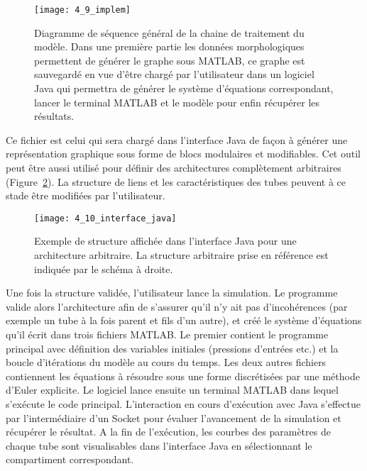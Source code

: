 \vspace{0.4cm}
\begin{figure}[!b]
\centering
\texttt{[image: 4\_9\_implem]}
\caption{Diagramme de séquence général de la chaine de traitement du modèle. Dans une première partie les données
morphologiques permettent de générer le graphe sous MATLAB, ce graphe est sauvegardé en vue d’être chargé par
l’utilisateur dans un logiciel Java qui permettra de générer le système d’équations correspondant, lancer le terminal MATLAB
et le modèle pour enfin récupérer les résultats.}
\label{fig:4_9_implem}	
\end{figure}
Ce fichier est celui qui sera chargé dans l’interface Java de façon à générer une représentation
graphique sous forme de blocs modulaires et modifiables. Cet outil peut être aussi utilisé pour définir
des architectures complètement arbitraires (Figure~\ref{fig:4_10_interface_java}). La structure de liens et les caractéristiques des
tubes peuvent à ce stade être modifiées par l’utilisateur.\\
\begin{figure}[!t]
\centering
\texttt{[image: 4\_10\_interface\_java]}
\caption{Exemple de structure affichée dans l'interface Java pour une architecture arbitraire. La structure arbitraire prise
en référence est indiquée par le schéma à droite.}
\label{fig:4_10_interface_java}	
\end{figure}
Une fois la structure validée, l’utilisateur lance la simulation. Le programme valide alors
l’architecture afin de s’assurer qu’il n’y ait pas d’incohérences (par exemple un tube à la fois parent et
fils d’un autre), et créé le système d’équations qu’il écrit dans trois fichiers MATLAB. Le premier
contient le programme principal avec définition des variables initiales (pressions d’entrées etc.) et la
boucle d’itérations du modèle au cours du temps. Les deux autres fichiers contiennent les équations à
résoudre sous une forme discrétisées par une méthode d’Euler explicite. Le logiciel lance ensuite un
terminal MATLAB dans lequel s’exécute le code principal. L’interaction en cours d’exécution avec Java
s’effectue par l’intermédiaire d’un Socket pour évaluer l’avancement de la simulation et récupérer le
résultat. A la fin de l’exécution, les courbes des paramètres de chaque tube sont visualisables dans
l’interface Java en sélectionnant le compartiment correspondant.\\
